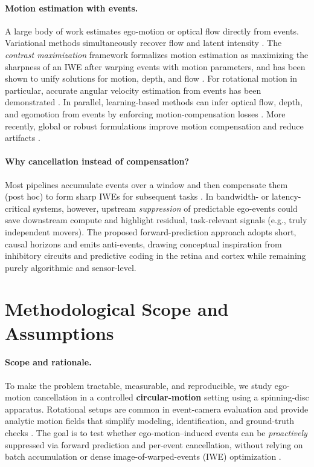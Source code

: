 \paragraph{Motion estimation with events.}
A large body of work estimates ego-motion or optical flow directly from events. Variational methods simultaneously recover flow and latent intensity \cite{Bardow2016SOFIE}. The \emph{contrast maximization} framework formalizes motion estimation as maximizing the sharpness of an IWE after warping events with motion parameters, and has been shown to unify solutions for motion, depth, and flow \cite{Gallego2018CMax}. For rotational motion in particular, accurate angular velocity estimation from events has been demonstrated \cite{Gallego2017Angular}. In parallel, learning-based methods can infer optical flow, depth, and egomotion from events by enforcing motion-compensation losses \cite{Zhu2019Unsupervised}. More recently, global or robust formulations improve motion compensation and reduce artifacts  \cite{Xu2020SmoothMC}.

\paragraph{Why cancellation instead of compensation?}
Most pipelines accumulate events over a window and then compensate them (post hoc) to form sharp IWEs for subsequent tasks \cite{Gallego2018CMax,Stoffregen2019Segmentation}. In bandwidth- or latency-critical systems, however, upstream \emph{suppression} of predictable ego-events could save downstream compute and highlight residual, task-relevant signals (e.g., truly independent movers). The proposed forward-prediction approach adopts short, causal horizons and emits anti-events, drawing conceptual inspiration from inhibitory circuits and predictive coding in the retina and cortex \cite{Hosoya2005RetinaPC,Rao1999V1PC} while remaining purely algorithmic and sensor-level.

\section{Methodological Scope and Assumptions}
\label{sec:scope-assumptions}

\paragraph{Scope and rationale.}
To make the problem tractable, measurable, and reproducible, we study ego-motion cancellation in a controlled \textbf{circular-motion} setting using a spinning-disc apparatus. Rotational setups are common in event-camera evaluation and provide analytic motion fields that simplify modeling, identification, and ground-truth checks \cite{Gallego2017Angular,Stoffregen2019Segmentation}. The goal is to test whether ego-motion–induced events can be \emph{proactively} suppressed via forward prediction and per-event cancellation, without relying on batch accumulation or dense image-of-warped-events (IWE) optimization \cite{Gallego2018CMax,Bardow2016SOFIE}.


